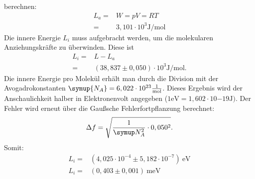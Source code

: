 berechnen:
\begin{align*}
  L_a =& W =pV=RT \\
      =& 3,101 \cdot 10^3 \si{\joule \per \mol}
\end{align*}
Die innere Energie $L_i$ muss aufgebracht werden, um die molekularen
Anziehungskräfte zu überwinden. Diese ist
\begin{align*}
  L_i=&L-L_a \\
  =& (38,837 \pm 0,050)\cdot 10^3 \si{\joule\per\mol}.
\end{align*}
 Die innere Energie pro Molekül erhält man durch die Division mit der Avogadrokonstanten
 $\symup{N_A}=6,022 \cdot 10^{23} \frac{1}{\si{\mol}}$.
 Dieses Ergebnis wird der Anschaulichkeit halber in Elektronenvolt angegeben
 ($1\si{\electronvolt}=1,602\cdot 10{{-19}}\si{\joule})$.
 Der Fehler wird erneut über die Gaußsche Fehlerfortpflanzung berechnet:
 \begin{equation*}
   \Delta f=\sqrt{\frac{1}{\symup N_A^2}\cdot 0,050^2}.
 \end{equation*}
 Somit:
 \begin{align*}
   L_i =&(4,025\cdot 10^{-4} \pm 5,182\cdot 10^{-7})\ \si{\electronvolt} \\
   L_i =&(0,403 \pm 0,001) \ \si{\milli\electronvolt}
 \end{align*}
